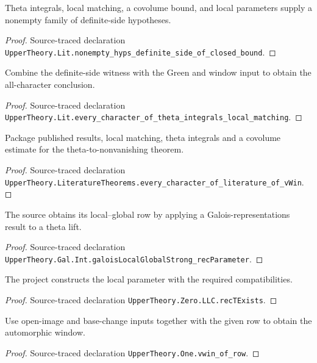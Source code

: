 {\begin{theorem}
\label{definite}
Theta integrals, local matching, a covolume bound, and local parameters supply a nonempty family of definite-side hypotheses.
\end{theorem}
\begin{proof}
Source-traced declaration \texttt{UpperTheory.Lit.nonempty\_hyps\_definite\_side\_of\_closed\_bound}.
\end{proof}


\begin{theorem}
\label{match}
Combine the definite-side witness with the Green and window input to obtain the all-character conclusion.
\end{theorem}
\begin{proof}
Source-traced declaration \texttt{UpperTheory.Lit.every\_character\_of\_theta\_integrals\_local\_matching}.
\end{proof}


\begin{theorem}
\label{literature}
Package published results, local matching, theta integrals and a covolume estimate for the theta-to-nonvanishing theorem.
\end{theorem}
\begin{proof}
Source-traced declaration \texttt{UpperTheory.LiteratureTheorems.every\_character\_of\_literature\_of\_vWin}.
\end{proof}


\begin{theorem}
\label{row}
The source obtains its local–global row by applying a Galois-representations result to a theta lift.
\end{theorem}
\begin{proof}
Source-traced declaration \texttt{UpperTheory.Gal.Int.galoisLocalGlobalStrong\_recParameter}.
\end{proof}


\begin{theorem}
\label{local}
The project constructs the local parameter with the required compatibilities.
\end{theorem}
\begin{proof}
Source-traced declaration \texttt{UpperTheory.Zero.LLC.recTExists}.
\end{proof}


\begin{theorem}
\label{window}
Use open-image and base-change inputs together with the given row to obtain the automorphic window.
\end{theorem}
\begin{proof}
Source-traced declaration \texttt{UpperTheory.One.vwin\_of\_row}.
\end{proof}


}
